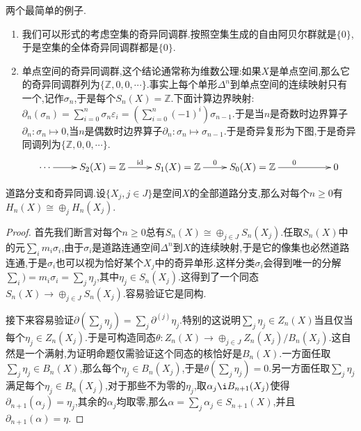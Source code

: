 两个最简单的例子.
\begin{enumerate}
	\item 我们可以形式的考虑空集的奇异同调群.按照空集生成的自由阿贝尔群就是$\{0\}$,于是空集的全体奇异同调群都是$\{0\}$.
	\item 单点空间的奇异同调群,这个结论通常称为维数公理:如果$X$是单点空间,那么它的奇异同调群列为$\{\mathbb{Z},0,0,\cdots\}$.事实上每个单形$\Delta^n$到单点空间的连续映射只有一个,记作$\sigma_n$,于是每个$S_n(X)=\mathbb{Z}$.下面计算边界映射:$\partial_n(\sigma_n)=\sum_{i=0}^n\sigma_n\varepsilon_i=\left(\sum_{i=0}^n(-1)^i\right)\sigma_{n-1}$.于是当$n$是奇数时边界算子$\partial_n:\sigma_n\mapsto0$,当$n$是偶数时边界算子$\partial_n:\sigma_n\mapsto\sigma_{n-1}$.于是奇异复形为下图,于是奇异同调列为$\{\mathbb{Z},0,0,\cdots\}$.
	$$\xymatrix{\cdots\ar[r]&S_2(X)=\mathbb{Z}\ar[r]^{\mathrm{id}}&S_1(X)=\mathbb{Z}\ar[r]^{0}&S_0(X)=\mathbb{Z}\ar[rr]^{0}&&0}$$
\end{enumerate}

道路分支和奇异同调.设$\{X_j,j\in J\}$是空间$X$的全部道路分支,那么对每个$n\ge0$有$H_n(X)\cong\oplus_jH_n(X_j)$.
\begin{proof}
	
	首先我们断言对每个$n\ge0$总有$S_n(X)\cong\oplus_{j\in J}S_n(X_j)$.任取$S_n(X)$中的元$\sum_i m_i\sigma_i$,由于$\sigma_i$是道路连通空间$\Delta^n$到$X$的连续映射,于是它的像集也必然道路连通,于是$\sigma_i$也可以视为恰好某个$X_j$中的奇异单形.这样分类$\sigma_i$会得到唯一的分解$\sum_i)=m_i\sigma_i=\sum_j\eta_j$,其中$\eta_j\in S_n(X_j)$.这得到了一个同态$S_n(X)\to\oplus_{j\in J}S_n(X_j)$.容易验证它是同构.
	
	接下来容易验证$\partial(\sum_j\eta_j)=\sum_j\partial^{(j)}\eta_j$.特别的这说明$\sum_j\eta_j\in Z_n(X)$当且仅当每个$\eta_j\in Z_n(X_j)$.于是可构造同态$\theta:Z_n(X)\to\oplus_{j\in J}Z_n(X_j)/B_n(X_j)$.这自然是一个满射,为证明命题仅需验证这个同态的核恰好是$B_n(X)$.一方面任取$\sum_j\eta_j\in B_n(X)$,那么每个$\eta_j\in B_n(X_j)$,于是$\theta(\sum_j\eta_j)=0$.另一方面任取$\sum_j\eta_j$满足每个$\eta_j\in B_n(X_j)$,对于那些不为零的$\eta_j$,取$\alpha_j\i B_{n+1}(X_j)$使得$\partial_{n+1}(\alpha_j)=\eta_j$,其余的$\alpha_j$均取零,那么$\alpha=\sum_j\alpha_j\in S_{n+1}(X)$,并且$\partial_{n+1}(\alpha)=\eta$.
\end{proof}

